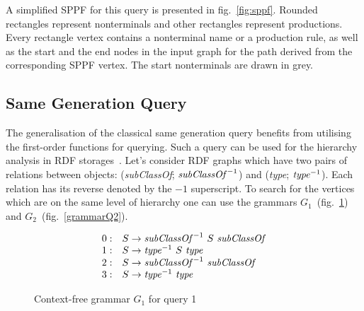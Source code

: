 A simplified SPPF for this query is presented in fig.~\ref{fig:sppf}. Rounded rectangles represent nonterminals and other rectangles represent productions.
Every rectangle vertex contains a nonterminal name or a production rule, as well as the start and the end nodes in the input graph for the path derived from the corresponding SPPF vertex.
The start nonterminals are drawn in grey.

\subsection{Same Generation Query}

The generalisation of the classical same generation query benefits from utilising the first-order functions for querying. 
Such a query can be used for the hierarchy analysis in RDF storages~\cite{CFGonRDF}.
Let's consider RDF graphs which have two pairs of relations between objects: (\emph{subClassOf}; $\text{\emph{subClassOf}}^{-1}$) and (\emph{type}; $\text{\emph{type}}^{-1}$). Each relation has its reverse denoted by the $-1$ superscript. 
To search for the vertices which are on the same level of hierarchy one can use the grammars $G_1$~(fig.~\ref{grammarQ1}) and $G_2$~(fig.~\ref{grammarQ2}).

%

\begin{figure}[h]
   \centering
   \[
\begin{array}{rl}
   0: & S \rightarrow \text{\textit{subClassOf}}^{-1} \ S \ \text{\textit{subClassOf}} \\
   1: & S \rightarrow \text{\textit{type}}^{-1} \ S \ \text{\textit{type}} \\
   2: & S \rightarrow \text{\textit{subClassOf}}^{-1} \ \text{\textit{subClassOf}} \\
   3: & S \rightarrow \text{\textit{type}}^{-1} \ \text{\textit{type}} \\
\end{array}
\]
   \caption{Context-free grammar $G_1$ for query 1}
   \label{grammarQ1}
   \end{figure}

